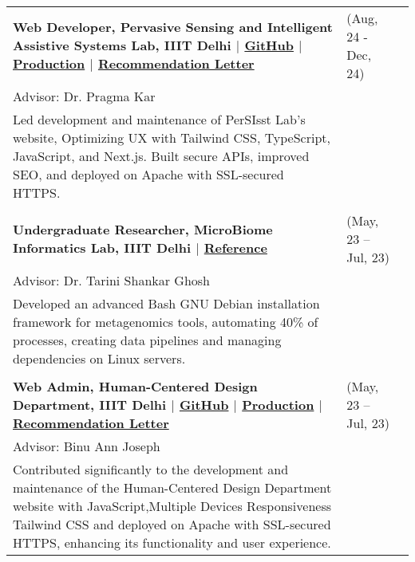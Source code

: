 \documentclass[10pt]{extarticle}
\begin{document}
\begin{contained}
\\
\begingroup%
\renewcommand\arraystretch{1}%
\begin{longtable}{p{}p{}p{}}
    \textbf{Web Developer, Pervasive Sensing and Intelligent Assistive Systems Lab, IIIT Delhi $\vert$ \href{https://github.com/kintsugi-programmer/PerSIsst-Lab}{GitHub} $\vert$ \href{https://persisst.iiitd.edu.in/}{Production} $\vert$ \href{https://drive.google.com/file/d/1uVUchMiUUwhLph9rYhSjSyHx-VntRaQw/view?usp=sharing}{Recommendation Letter} } &(Aug, 24 - Dec, 24)\\
    {Advisor: Dr. Pragma Kar}\\
    Led development and maintenance of PerSIsst Lab's website, Optimizing UX with Tailwind CSS, TypeScript, JavaScript, and Next.js. Built secure APIs, improved SEO, and deployed on Apache with SSL-secured HTTPS.\\
    \\
    \textbf{Undergraduate Researcher, MicroBiome Informatics Lab, IIIT Delhi $\vert$ \href{https://drive.google.com/drive/folders/1c-4UNfR6s3NiEw_pWJEUwc6RTah0MxOR?usp=sharing}{Reference}} &(May, 23 – Jul, 23)\\
    {Advisor: Dr. Tarini Shankar Ghosh}\\ Developed an advanced Bash GNU Debian installation framework for metagenomics tools, automating 40\% of processes, creating data pipelines and managing dependencies on Linux servers.
    \\\\
    \textbf{Web Admin, Human-Centered Design Department, IIIT Delhi  
     $\vert$ \href{https://github.com/kintsugi-programmer/HCD}{GitHub} $\vert$ \href{https://hcd.iiitd.ac.in/}{Production} $\vert$
    \href{https://drive.google.com/drive/folders/1c-4UNfR6s3NiEw_pWJEUwc6RTah0MxOR?usp=sharing}{Recommendation Letter} } &(May, 23 – Jul, 23)\\
    {Advisor: Binu Ann Joseph}\\
    Contributed significantly to the development and maintenance of the Human-Centered Design Department website with JavaScript,Multiple Devices Responsiveness Tailwind CSS and deployed on Apache with SSL-secured HTTPS, enhancing its functionality and user experience.\\
\end{longtable}%
\endgroup%
\end{contained}
\end{document}
